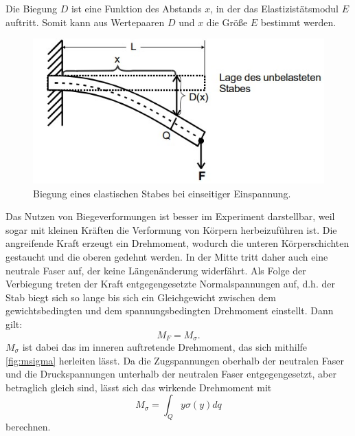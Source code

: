 Die Biegung $D$ ist eine Funktion des Abstands $x$, in der das Elastizistätsmodul $E$ auftritt. Somit kann aus Wertepaaren $D$ und $x$ die Größe $E$ bestimmt werden.
\begin{figure}[H]
    \includegraphics[width=\linewidth]{img/abb2.jpg}
    \caption{Biegung eines elastischen Stabes bei einseitiger Einspannung.}
    \label{fig:biegung}
\end{figure}
Das Nutzen von Biegeverformungen ist besser im Experiment darstellbar, weil sogar mit kleinen Kräften die Verformung von Körpern herbeizuführen ist.
Die angreifende Kraft erzeugt  ein Drehmoment, wodurch die unteren Körperschichten gestaucht und die oberen gedehnt werden.
In der Mitte tritt daher auch eine neutrale Faser auf, der keine Längenänderung widerfährt.
Als Folge der Verbiegung treten der Kraft entgegengesetzte Normalspannungen auf, d.h. der Stab biegt sich so lange bis sich ein Gleichgewicht zwischen dem
gewichtsbedingten und dem spannungsbedingten Drehmoment einstellt. Dann gilt:
\begin{equation*}
    M_F = M_{\sigma}.
\end{equation*}
$M_{\sigma}$ ist dabei das im inneren auftretende Drehmoment, das sich mithilfe \autoref{fig:msigma} herleiten lässt. Da die Zugspannungen oberhalb der neutralen
Faser und die Druckspannungen unterhalb der neutralen Faser entgegengesetzt, aber betraglich gleich sind, lässt sich das wirkende Drehmoment mit
\begin{equation*}
    M_{\sigma} = \int_{Q} y\sigma(y) dq
\end{equation*}
berechnen.\\
